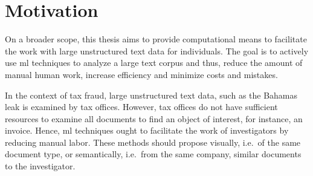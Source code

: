 \section{Motivation}\label{sec:motivation}

On a broader scope, this thesis aims to provide computational means to facilitate the work with large unstructured text data for individuals.
The goal is to actively use \ac{ml} techniques to analyze a large text corpus and thus, reduce the amount of manual human work, 
increase efficiency and minimize costs and mistakes.

In the context of tax fraud, large unstructured text data, such as the Bahamas leak is examined by tax offices.
However, tax offices do not have sufficient resources to examine all documents to find an object of interest, for instance, an invoice.
Hence, \ac{ml} techniques ought to facilitate the work of investigators by reducing manual labor.
These methods should propose visually, i.e.\ of the same document type, or semantically, i.e.\ from the same company, similar documents to the investigator.